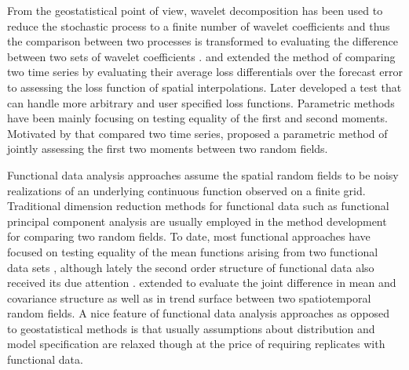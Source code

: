 \documentclass[12pt]{article}
\begin{document}
From the geostatistical point of view,  wavelet decomposition has been used to reduce the stochastic process to a finite number of  wavelet coefficients and thus the comparison between two processes is transformed to evaluating the difference between two sets of wavelet coefficients \citep{briggs, shen, pavlicova}. 
 \citet{snell} and \citet{wang} extended the method of comparing two time series by evaluating their average loss differentials over the forecast error to assessing the loss function of spatial interpolations. Later \citet{hering} developed a test that can handle more arbitrary and user specified loss functions. Parametric methods have been mainly focusing on testing equality of the first and second moments. Motivated by \citet{lund} that compared two time series, \citet{li1} proposed a parametric method of jointly assessing the first two moments between two random fields. 
 
Functional data analysis approaches assume the spatial random fields to be noisy realizations of an underlying continuous function observed on a finite grid. Traditional dimension reduction methods for functional data such as functional principal component analysis are usually employed in the method development for comparing two random fields. To date, most functional approaches have focused on testing equality of the mean functions arising from two functional data sets \citep{ramsay, zhang2, horvath, staicu2}, although lately the second order structure of functional data also received its due attention \citep{zhang1}. \citet{li2} extended \citet{zhang1} to evaluate the joint difference in mean and covariance structure as well as in trend surface between two spatiotemporal random fields. A nice feature of functional data analysis approaches as opposed to geostatistical methods is that usually assumptions about distribution and model specification are relaxed though at the price of requiring replicates with functional data.  
 
\end{document}
